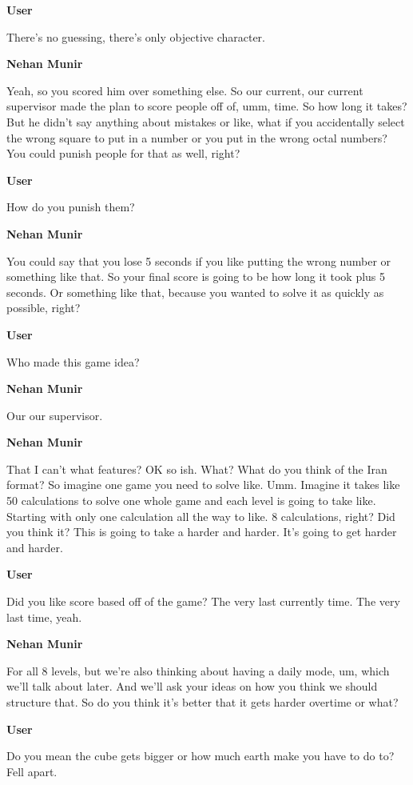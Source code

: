 \documentclass{article}
\begin{document}
\noindent \textbf{User}

There's no guessing, there's only objective character.

\noindent \textbf{Nehan Munir}

Yeah, so you scored him over something else. So our current, our current supervisor made the plan to score people off of, umm, time. So how long it takes? But he didn't say anything about mistakes or like, what if you accidentally select the wrong square to put in a number or you put in the wrong octal numbers? You could punish people for that as well, right?

\noindent \textbf{User}

How do you punish them?

\noindent \textbf{Nehan Munir}

You could say that you lose 5 seconds if you like putting the wrong number or something like that. So your final score is going to be how long it took plus 5 seconds. Or something like that, because you wanted to solve it as quickly as possible, right?

\noindent \textbf{User}

Who made this game idea?

\noindent \textbf{Nehan Munir}

Our our supervisor.

\noindent \textbf{Nehan Munir}

That I can't what features? OK so ish. What? What do you think of the Iran format? So imagine one game you need to solve like. Umm. Imagine it takes like 50 calculations to solve one whole game and each level is going to take like. Starting with only one calculation all the way to like. 8 calculations, right? Did you think it? This is going to take a harder and harder. It's going to get harder and harder.

\noindent \textbf{User}

Did you like score based off of the game? The very last currently time. The very last time, yeah.

\noindent \textbf{Nehan Munir}

For all 8 levels, but we're also thinking about having a daily mode, um, which we'll talk about later. And we'll ask your ideas on how you think we should structure that. So do you think it's better that it gets harder overtime or what?

\noindent \textbf{User}

Do you mean the cube gets bigger or how much earth make you have to do to? Fell apart.
\end{document}
